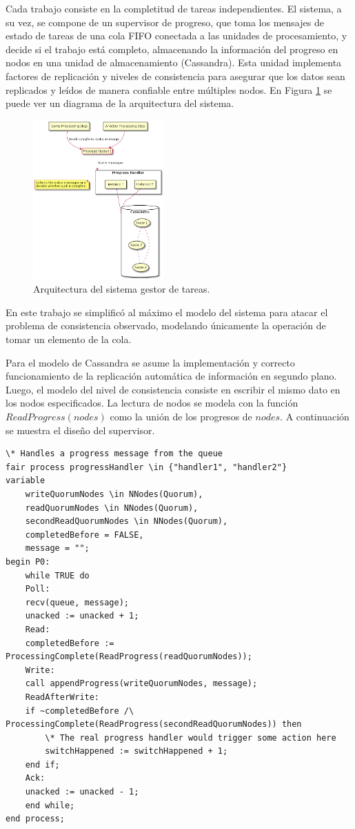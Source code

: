 \documentclass[runningheads]{llncs}
\begin{document}
Cada trabajo consiste en la completitud de tareas independientes. El sistema, a su vez, se compone de un supervisor de progreso, que toma los mensajes de estado de tareas de una cola FIFO conectada a las unidades de procesamiento, y decide si el trabajo está completo, almacenando la información del progreso en nodos en una unidad de almacenamiento (Cassandra). Esta unidad implementa factores de replicación y niveles de consistencia para asegurar que los datos sean replicados y leídos de manera confiable entre múltiples nodos. En Figura \ref{caso_estudio} se puede ver un diagrama de la arquitectura del sistema. 

\begin{figure}
    \caption{Arquitectura del sistema gestor de tareas.}\label{caso_estudio}
    \includegraphics[width=5cm]{formalizing-the-system.png}
    \centering
\end{figure}

En este trabajo se simplificó al máximo el modelo del sistema para atacar el problema de consistencia observado, modelando únicamente la operación de tomar un elemento de la cola.

Para el modelo de Cassandra se asume la implementación y correcto funcionamiento de la replicación automática de información en segundo plano. Luego, el modelo del nivel de consistencia consiste en escribir el mismo dato en los nodos especificados. La lectura de nodos se modela con la función $ReadProgress(nodes)$ como la unión de los progresos de $nodes$. A continuación se muestra el diseño del supervisor.

\begin{lstlisting}
\* Handles a progress message from the queue
fair process progressHandler \in {"handler1", "handler2"}
variable
    writeQuorumNodes \in NNodes(Quorum),
    readQuorumNodes \in NNodes(Quorum),
    secondReadQuorumNodes \in NNodes(Quorum),
    completedBefore = FALSE,
    message = "";
begin P0:
    while TRUE do
    Poll:
    recv(queue, message);
    unacked := unacked + 1;
    Read:
    completedBefore := ProcessingComplete(ReadProgress(readQuorumNodes));
    Write:
    call appendProgress(writeQuorumNodes, message);
    ReadAfterWrite:
    if ~completedBefore /\ ProcessingComplete(ReadProgress(secondReadQuorumNodes)) then
        \* The real progress handler would trigger some action here
        switchHappened := switchHappened + 1;
    end if;
    Ack:
    unacked := unacked - 1;
    end while;
end process;    
\end{lstlisting}
\end{document}
